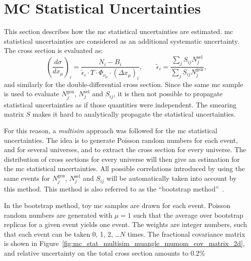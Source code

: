 \section{MC Statistical Uncertainties}
\label{sec:error_mcstat}

This section describes how the \acrshort{mc} statistical uncertainties are estimated. \acrshort{mc} statistical uncertainties are considered as an additional systematic uncertainty. The cross section is evaluated as:
\[
\left ( \frac{d\sigma}{dx_\mu} \right )_i = \frac{N_i - B_i}{ \tilde{\epsilon}_i \cdot T \cdot \Phi_{\nu_\mu} \cdot (\Delta x_\mu)_i}, \qquad \tilde{\epsilon}_i = \frac{\sum_jS_{ij}N_j^\text{sel}}{\sum_jS_{ij}N_j^\text{gen}},
\]
and similarly for the double-differential cross section.
Since the same \acrshort{mc} sample is used to evaluate $N_j^\text{gen}$, $N_j^\text{sel}$ and $S_{ij}$, it is then not possible to propagate statistical uncertainties as if those quantities were independent. The smearing matrix $S$ makes it hard to analytically propagate the statistical uncertainties. 

For this reason, a \emph{multisim} approach was followed for the \acrshort{mc} statistical uncertainties. The idea is to generate Poisson random numbers for each event, and for several universes, and to extract the cross section for every universe. The distribution of cross sections for every universe will then give an estimation for the \acrshort{mc} statistical uncertainties. All possible correlations introduced by using the same events for $N_j^\text{gen}$, $N_j^\text{sel}$ and $S_{ij}$ will be automatically taken into account by this method. This method is also referred to as the ``bootstrap method''~\cite{bootstrap}.

In the bootstrap method, toy \acrshort{mc} samples are drawn for each event. Poisson random numbers are generated with $\mu = 1$ such that the average over bootstrap replicas for a given event yields one event. The weights are integer numbers, such that each event can be taken 0, 1, 2, \dots $N$ times. 
The fractional covariance matrix is shown in Figure~\ref{fig:mc_stat_multisim_muangle_mumom_cov_matrix_2d}, and relative uncertainty on the total cross section amounts to 0.2\%

